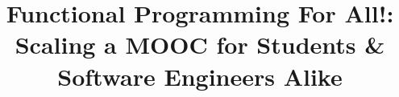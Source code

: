 \documentclass{sig-alternate}
\begin{document}
\setmonofont[Scale=0.8,BoldFont={Consolas Bold}]{Consolas}
%

\title{Functional Programming For All!:\\Scaling a MOOC for Students \& Software Engineers Alike}

%
%
%
%
%
\end{document}
